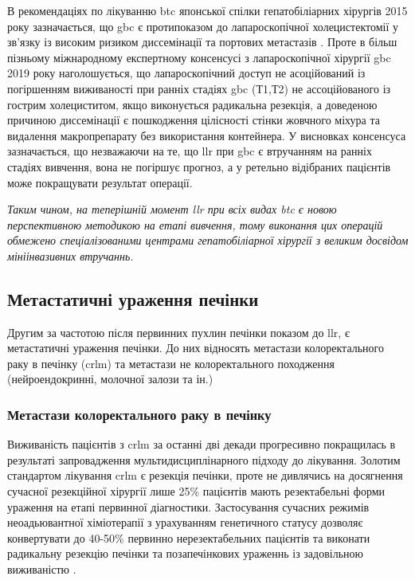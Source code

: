 \begin{refsection}
В рекомендаціях по лікуванню \acrshort{btc} японської спілки гепатобіліарних хірургів 2015 року зазначається, що \acrshort{gbc} є протипоказом до лапароскопічної холецистектомії у зв'язку із високим ризиком диссемінації та портових метастазів \cite{Miyazaki2015}. Проте в більш пізньому міжнародному експертному консенсусі з лапароскопічної хірургії \acrshort{gbc} 2019 року наголошується, що лапароскопічний доступ не асоційований із погіршенням виживаності при ранніх стадіях \acrshort{gbc} (Т1,Т2) не ассоційованого із гострим холециститом, якщо виконується радикальна резекція, а доведеною причиною диссемінації є пошкодження цілісності стінки жовчного міхура та видалення макропрепарату без використання контейнера. У висновках консенсуса зазначається, що незважаючи на те, що \acrshort{llr} при \acrshort{gbc} є втручанням на ранніх стадіях вивчення, вона не погіршує прогноз, а у ретельно відібраних пацієнтів може покращувати результат операції. 


\emph{Таким чином, на теперішній момент \acrshort{llr} при всіх видах \acrshort{btc} є новою перспективною методикою на етапі вивчення, тому виконання цих операцій обмежено спеціалізованими центрами гепатобіліарної хірургії з великим досвідом мініінвазивних втручаннь.}

\subsection{Метастатичні ураження печінки}

Другим за частотою після первинних пухлин печінки показом до \acrshort{llr}, є метастатичні ураження печінки. До них відносять метастази колоректального раку в печінку (\acrshort{crlm}) та метастази не колоректального походження (нейроендокринні, молочної залози та ін.)


\subsubsection{Метастази колоректального раку в печінку}

Виживаність пацієнтів з \acrshort{crlm} за останні дві декади прогресивно покращилась в результаті запровадження мультидисциплінарного підходу до лікування. Золотим стандартом лікування \acrshort{crlm} є резекція печінки, проте не дивлячись на досягнення сучасної резекційної хірургії лише 25\% пацієнтів мають резектабельні форми ураження на етапі первинної діагностики. Застосування сучасних режимів неоадьювантної хіміотерапії з урахуванням генетичного статусу дозволяє конвертувати до 40-50\% первинно нерезектабельних пацієнтів та виконати радикальну резекцію печінки та позапечінкових ураженнь із задовільною виживаністю \cite{Adam2019a}. 


\end{refsection}
